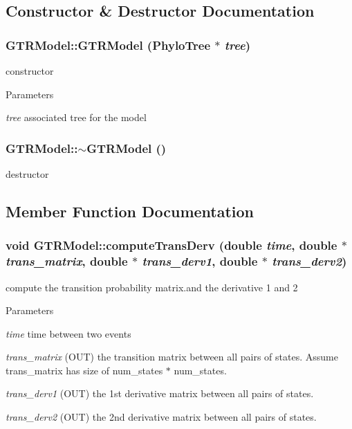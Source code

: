 \subsection{Constructor \& Destructor Documentation}
\hypertarget{classGTRModel_a6c79a459f383e64ee9540eaf8b854827}{
\subsubsection[{GTRModel}]{\setlength{\rightskip}{0pt plus 5cm}GTRModel::GTRModel ({\bf PhyloTree} $\ast$ {\em tree})}}
\label{classGTRModel_a6c79a459f383e64ee9540eaf8b854827}
constructor 
\begin{DoxyParams}{Parameters}
\item[{\em tree}]associated tree for the model \end{DoxyParams}
\hypertarget{classGTRModel_aca20597dad26270745e2e82c771b5ee9}{
\subsubsection[{$\sim$GTRModel}]{\setlength{\rightskip}{0pt plus 5cm}GTRModel::$\sim$GTRModel ()}}
\label{classGTRModel_aca20597dad26270745e2e82c771b5ee9}
destructor 

\subsection{Member Function Documentation}
\hypertarget{classGTRModel_a9f6c7532d57b0e41d95dd95c5972cf5b}{
\subsubsection[{computeTransDerv}]{\setlength{\rightskip}{0pt plus 5cm}void GTRModel::computeTransDerv (double {\em time}, \/  double $\ast$ {\em trans\_\-matrix}, \/  double $\ast$ {\em trans\_\-derv1}, \/  double $\ast$ {\em trans\_\-derv2})}}
\label{classGTRModel_a9f6c7532d57b0e41d95dd95c5972cf5b}
compute the transition probability matrix.and the derivative 1 and 2 
\begin{DoxyParams}{Parameters}
\item[{\em time}]time between two events \item[{\em trans\_\-matrix}](OUT) the transition matrix between all pairs of states. Assume trans\_\-matrix has size of num\_\-states $\ast$ num\_\-states. \item[{\em trans\_\-derv1}](OUT) the 1st derivative matrix between all pairs of states. \item[{\em trans\_\-derv2}](OUT) the 2nd derivative matrix between all pairs of states. \end{DoxyParams}


